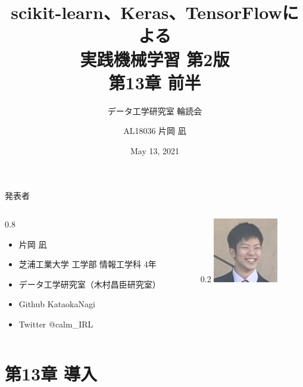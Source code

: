\documentclass[aspectratio=169, dvipdfmx, 14pt, xcolor={svgnames,dvipsnames}, t]{beamer}
\title[実践機械学習 輪読会 第13章 前半]{scikit-learn、Keras、TensorFlowによる\\実践機械学習 第2版\\第13章 前半}
\subtitle{データ工学研究室 輪読会}
\author[片岡 凪]{AL18036 片岡 凪}
\institute[データ工学研究室 B4]{芝浦工業大学 工学部 情報工学科 4年}
\date{May 13, 2021}
\newlength{\mytotalwidth}
\newlength{\mycolumnwidth}
\begin{document}

\maketitle


\begin{frame}{発表者}
  \begin{columns}[totalwidth=\mytotalwidth]
    \begin{column}[t]{0.8\mycolumnwidth}
      \begin{itemize}
        \item 片岡 凪
        \item 芝浦工業大学 工学部 情報工学科 4年
        \item データ工学研究室（木村昌臣研究室）
        \item Github  KataokaNagi
        \item Twitter @calm\_IRL
      \end{itemize}
    \end{column}
    \begin{column}[T]{0.2\mycolumnwidth}
      \centering
      \includegraphics[width=80pt]{img/icon.jpg}
    \end{column}
  \end{columns}
\end{frame}




\hypertarget{ux7b2c13ux7ae0-ux5c0eux5165}{%
  \section{第13章 導入}\label{ux7b2c13ux7ae0-ux5c0eux5165}}

\end{document}

